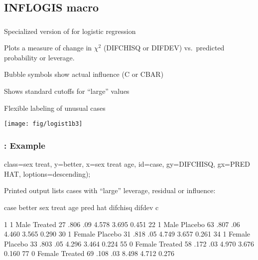\subsection{INFLOGIS macro}
\begin{frame}
  \frametitle{}
  \begin{itemize*}
	\item Specialized version of  for logistic regression
	\item Plots a measure of change in $\chi^2$ (DIFCHISQ or DIFDEV) vs.\
	predicted probability or leverage.
	\item Bubble symbols show actual influence (C or CBAR)
	\item Shows standard cutoffs for ``large'' values
	\item Flexible labeling of unusual cases
  \end{itemize*}
 \begin{center}
  \texttt{[image: fig/logist1b3]}
 \end{center}

\end{frame}

\begin{frame}[fragile]
  \frametitle{: Example}
\begin{Input}[fontsize=\small,label=\fbox{\texttt{logist1b.sas}}]
   class=sex treat,      
   y=better,             
   x=sex treat age,      
   id=case,              
   gy=DIFCHISQ,          
   gx=PRED HAT,          
   loptions=descending);
\end{Input}
Printed output lists cases with ``large'' leverage, residual or influence:

\begin{Output}[gobble=4,fontsize=\footnotesize]
    case better  sex    treat  age pred  hat difchisq difdev    c

      1     1   Male   Treated  27 .806  .09   4.578   3.695  0.451
     22     1   Male   Placebo  63 .807  .06   4.460   3.565  0.290
     30     1   Female Placebo  31 .818  .05   4.749   3.657  0.261
     34     1   Female Placebo  33 .803  .05   4.296   3.464  0.224
     55     0   Female Treated  58 .172  .03   4.970   3.676  0.160
     77     0   Female Treated  69 .108  .03   8.498   4.712  0.276
\end{Output}
 
\end{frame}

